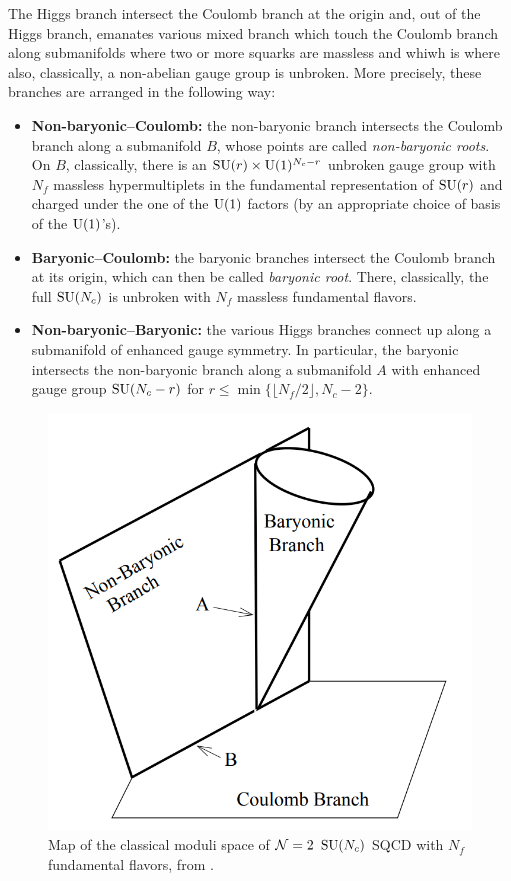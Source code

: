         The Higgs branch intersect the Coulomb branch at the origin and, out of the Higgs branch, emanates various mixed branch which touch the Coulomb branch along submanifolds where two or more squarks are massless and whiwh is where also, classically, a non-abelian gauge group is unbroken. More precisely, these branches are arranged in the following way:
        \begin{itemize}
            \item \textbf{Non-baryonic--Coulomb:} the non-baryonic branch intersects the Coulomb branch along a submanifold $B$, whose points are called \emph{non-baryonic roots}. On $B$, classically, there is an $\text{SU}(r)\times\text{U}(1)^{N_c-r}$ unbroken gauge group with $N_f$ massless hypermultiplets in the fundamental representation of $\text{SU}(r)$ and charged under the one of the $\text{U}(1)$ factors (by an appropriate choice of basis of the $\text{U}(1)$'s).
            \item \textbf{Baryonic--Coulomb:} the baryonic branches intersect the Coulomb branch at its origin, which can then be called \emph{baryonic root}. There, classically, the full $\text{SU}(N_c)$ is unbroken with $N_f$ massless fundamental flavors.
            \item \textbf{Non-baryonic--Baryonic:} the various Higgs branches connect up along a submanifold of enhanced gauge symmetry. In particular, the baryonic intersects the non-baryonic branch along a submanifold $A$ with enhanced gauge group $\text{SU}(N_c-r)$ for $r\leq \min\{\lfloor N_f/2\rfloor,N_c-2\}$.
        \end{itemize}
        
        \begin{figure}[H]
            \centering
            \includegraphics[scale=0.3]{Pictures/classicalmodulispace.png}
            \caption{Map of the classical moduli space of $\mathcal{N}=2$ $\text{SU}(N_c)$ SQCD with $N_f$ fundamental flavors, from \cite{Argyres_1996}.}
        \end{figure}

